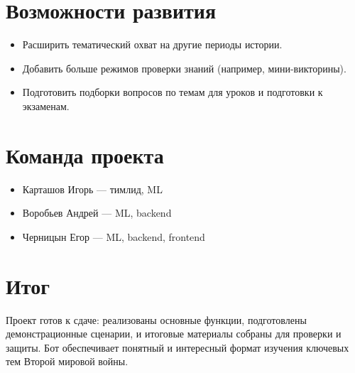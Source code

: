 \documentclass[a4paper,14pt]{extarticle}
\begin{document}
    \section{Возможности развития}
    \begin{itemize}
        \item Расширить тематический охват на другие периоды истории.
        \item Добавить больше режимов проверки знаний (например, мини-викторины).
        \item Подготовить подборки вопросов по темам для уроков и подготовки к экзаменам.
    \end{itemize}

    \section{Команда проекта}
    \begin{itemize}
        \item Карташов Игорь — тимлид, ML
        \item Воробьев Андрей — ML, backend
        \item Черницын Егор — ML, backend, frontend
    \end{itemize}

    \section{Итог}
    Проект готов к сдаче: реализованы основные функции, подготовлены демонстрационные сценарии, и итоговые материалы собраны для проверки и защиты. Бот обеспечивает понятный и интересный формат изучения ключевых тем Второй мировой войны.
\end{document}
